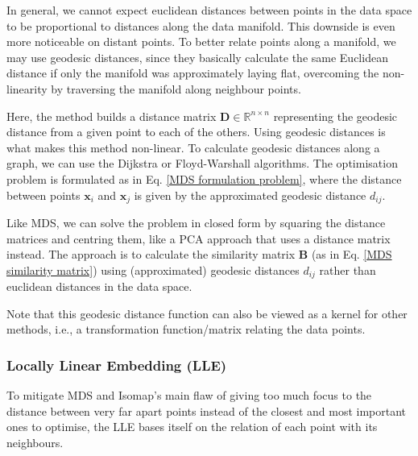         In general, we cannot expect euclidean distances between points in the data space to be proportional to distances along the data manifold. This downside is even more noticeable on distant points. To better relate points along a manifold, we may use geodesic distances, since they basically calculate the same Euclidean distance if only the manifold was approximately laying flat, overcoming the non-linearity by traversing the manifold along neighbour points.
        
        Here, the method builds a distance matrix $\bm{D}\in\mathbb{R}^{n\times n}$ representing the geodesic distance from a given point to each of the others. Using geodesic distances is what makes this method non-linear. To calculate geodesic distances along a graph, we can use the Dijkstra or Floyd-Warshall algorithms. The optimisation problem is formulated as in Eq. \ref{MDS formulation problem}, where the distance between points $\bm{x}_i$ and $\bm{x}_j$ is given by the approximated geodesic distance $d_{ij}$.
        
        Like MDS, we can solve the problem in closed form by squaring the distance matrices and centring them, like a PCA approach that uses a distance matrix instead. The approach is to calculate the similarity matrix $\bm{B}$ (as in Eq. \ref{MDS similarity matrix}) using (approximated) geodesic distances $d_{ij}$ rather than euclidean distances in the data space.

        Note that this geodesic distance function can also be viewed as a kernel for other methods, i.e., a transformation function/matrix relating the data points.
    
    \subsubsection{Locally Linear Embedding (LLE)}
        To mitigate MDS and Isomap's main flaw of giving too much focus to the distance between very far apart points instead of the closest and most important ones to optimise, the LLE \cite{lle} bases itself on the relation of each point with its neighbours.

